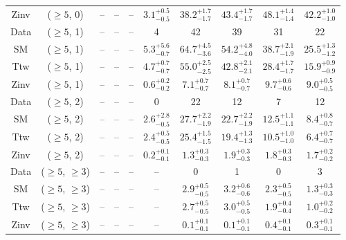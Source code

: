 \begin{table}[h!]
{\begin{tabular}{cccccccccc}
	Zinv & ($\ge5$, 0) & -- & -- & -- & $3.1^{+ 0.5 }_{- 0.5 }$ & $38.2^{+ 1.7 }_{- 1.7 }$ & $43.4^{+ 1.7 }_{- 1.7 }$ & $48.1^{+ 1.4 }_{- 1.4 }$ & $42.2^{+ 1.0 }_{- 1.0 }$ \\[0.5ex] 
	Data & ($\ge5$, 1) & -- & -- & -- & 4 & 42 & 39 & 31 & 22 \\[0.5ex] 
	SM & ($\ge5$, 1) & -- & -- & -- & $5.3^{+ 5.6 }_{- 0.7 }$ & $64.7^{+ 4.5 }_{- 3.6 }$ & $54.2^{+ 4.8 }_{- 4.0 }$ & $38.7^{+ 2.1 }_{- 1.9 }$ & $25.5^{+ 1.3 }_{- 1.2 }$ \\[0.5ex] 
	Ttw & ($\ge5$, 1) & -- & -- & -- & $4.7^{+ 0.7 }_{- 0.7 }$ & $55.0^{+ 2.5 }_{- 2.5 }$ & $42.8^{+ 2.1 }_{- 2.1 }$ & $28.4^{+ 1.7 }_{- 1.7 }$ & $15.9^{+ 0.9 }_{- 0.9 }$ \\[0.5ex] 
	Zinv & ($\ge5$, 1) & -- & -- & -- & $0.6^{+ 0.2 }_{- 0.2 }$ & $7.1^{+ 0.7 }_{- 0.7 }$ & $8.1^{+ 0.7 }_{- 0.7 }$ & $9.7^{+ 0.6 }_{- 0.6 }$ & $9.0^{+ 0.5 }_{- 0.5 }$ \\[0.5ex] 
	Data & ($\ge5$, 2) & -- & -- & -- & 0 & 22 & 12 & 7 & 12 \\[0.5ex] 
	SM & ($\ge5$, 2) & -- & -- & -- & $2.6^{+ 2.8 }_{- 0.5 }$ & $27.7^{+ 2.2 }_{- 1.9 }$ & $22.7^{+ 2.2 }_{- 1.9 }$ & $12.5^{+ 1.1 }_{- 1.1 }$ & $8.4^{+ 0.8 }_{- 0.7 }$ \\[0.5ex] 
	Ttw & ($\ge5$, 2) & -- & -- & -- & $2.4^{+ 0.5 }_{- 0.5 }$ & $25.4^{+ 1.5 }_{- 1.5 }$ & $19.4^{+ 1.3 }_{- 1.3 }$ & $10.5^{+ 1.0 }_{- 1.0 }$ & $6.4^{+ 0.7 }_{- 0.7 }$ \\[0.5ex] 
	Zinv & ($\ge5$, 2) & -- & -- & -- & $0.2^{+ 0.1 }_{- 0.1 }$ & $1.3^{+ 0.3 }_{- 0.3 }$ & $1.9^{+ 0.3 }_{- 0.3 }$ & $1.8^{+ 0.3 }_{- 0.3 }$ & $1.7^{+ 0.2 }_{- 0.2 }$ \\[0.5ex] 
	Data & ($\ge5$, $\ge3$) & -- & -- & -- & -- & 0 & 1 & 0 & 3 \\[0.5ex] 
	SM & ($\ge5$, $\ge3$) & -- & -- & -- & -- & $2.9^{+ 0.5 }_{- 0.5 }$ & $3.2^{+ 0.6 }_{- 0.6 }$ & $2.3^{+ 0.5 }_{- 0.5 }$ & $1.3^{+ 0.3 }_{- 0.3 }$ \\[0.5ex] 
	Ttw & ($\ge5$, $\ge3$) & -- & -- & -- & -- & $2.7^{+ 0.5 }_{- 0.5 }$ & $3.0^{+ 0.5 }_{- 0.5 }$ & $1.9^{+ 0.4 }_{- 0.4 }$ & $1.0^{+ 0.2 }_{- 0.2 }$ \\[0.5ex] 
	Zinv & ($\ge5$, $\ge3$) & -- & -- & -- & -- & $0.1^{+ 0.1 }_{- 0.1 }$ & $0.1^{+ 0.1 }_{- 0.1 }$ & $0.4^{+ 0.1 }_{- 0.1 }$ & $0.3^{+ 0.1 }_{- 0.1 }$ \\[0.5ex] 
	\hline
	\hline
\end{tabular}}
\end{table}
